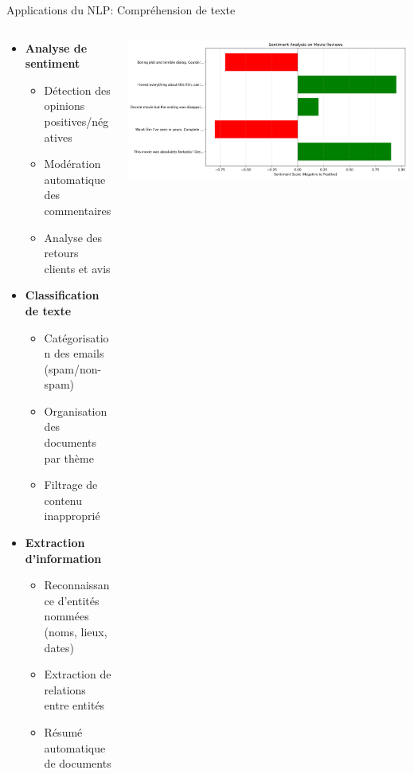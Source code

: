 \documentclass[aspectratio=169,11pt]{beamer}
\begin{document}
\begin{frame}{Applications du NLP: Compréhension de texte}
    \begin{columns}
        \begin{column}{0.55\textwidth}
            \begin{itemize}
                \item \textbf{Analyse de sentiment}
                \begin{itemize}
                    \item Détection des opinions positives/négatives
                    \item Modération automatique des commentaires
                    \item Analyse des retours clients et avis
                \end{itemize}
                \vspace{0.3cm}
                \item \textbf{Classification de texte}
                \begin{itemize}
                    \item Catégorisation des emails (spam/non-spam)
                    \item Organisation des documents par thème
                    \item Filtrage de contenu inapproprié
                \end{itemize}
                \vspace{0.3cm}
                \item \textbf{Extraction d'information}
                \begin{itemize}
                    \item Reconnaissance d'entités nommées (noms, lieux, dates)
                    \item Extraction de relations entre entités
                    \item Résumé automatique de documents
                \end{itemize}
            \end{itemize}
        \end{column}
        \begin{column}{0.45\textwidth}
            \includegraphics[width=\textwidth]{images/generated/sentiment_analysis.png}

\end{column}
\end{columns}
\end{frame}
\end{document}
